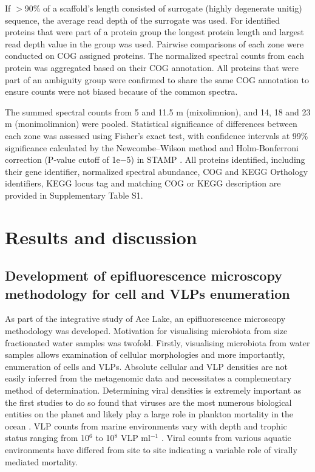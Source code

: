 If $>$90\% of a scaffold’s length consisted of surrogate (highly degenerate unitig) sequence, the average read depth of the surrogate was used. 
For identified proteins that were part of a protein group the longest protein length and largest read depth value in the group was used. 
Pairwise comparisons of each zone were conducted on \ac{COG} assigned proteins. 
The normalized spectral counts from each protein was aggregated based on their \ac{COG} annotation. 
All proteins that were part of an ambiguity group were confirmed to share the same \ac{COG} annotation to ensure counts were not biased because of the common spectra.

The summed spectral counts from 5 and 11.5 m (mixolimnion), and 14, 18 and 23 m (monimolimnion) were pooled. 
Statistical significance of differences between each zone was assessed using Fisher's exact test, with confidence intervals at 99\% significance calculated by the Newcombe–Wilson method and Holm-Bonferroni correction (P-value cutoff of 1e$-$5) in \ac{STAMP} \cite{Parks2010}. 
All proteins identified, including their gene identifier, normalized spectral abundance, \ac{COG} and \ac{KEGG} Orthology identifiers, \ac{KEGG} locus tag and matching \ac{COG} or \ac{KEGG} description are provided in Supplementary Table S1.




\section{Results and discussion}

\subsection[Epifluorescence microscopy methodology]{Development of epifluorescence microscopy methodology for cell and \acp{VLP} enumeration}
As part of the integrative study of Ace Lake, an epifluorescence microscopy methodology was developed.
Motivation for visualising microbiota from size fractionated water samples was twofold. 
Firstly, visualising microbiota from water samples allows examination of cellular morphologies and more importantly, enumeration of cells and \acp{VLP}.
Absolute cellular and \ac{VLP} densities are not easily inferred from the metagenomic data and necessitates a complementary method of determination.
Determining viral densities is extremely important as the first studies to do so found that viruses are the most numerous biological entities on the planet and likely play a large role in plankton mortality in the ocean \cite{Bergh1989,Proctor1990}. %
\ac{VLP} counts from marine environments vary with depth and trophic status ranging from 10$^6$ to 10$^8$ \acs{VLP} ml$^{-1}$ \cite{Suttle2005}. %
Viral counts from various aquatic environments have differed from site to site indicating a variable role of virally mediated mortality. %

